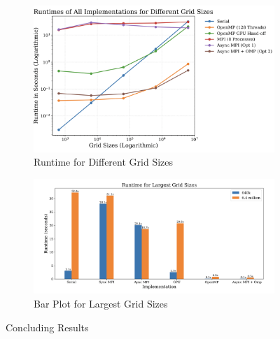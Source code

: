 \documentclass[a4paper,10pt]{article}
\begin{document}
\begin{figure}
     \centering
     \begin{subfigure}[b]{0.45\textwidth}
         \centering
         \includegraphics[width=\textwidth]{../images/final_everything_plot.png}
         \caption{Runtime for Different Grid Sizes}
         \label{fig:conclusion_line_plot}
     \end{subfigure}
     \hfill
     \begin{subfigure}[b]{0.45\textwidth}
         \centering
         \includegraphics[width=\textwidth]{../images/final_everything_bar.png}
         \caption{Bar Plot for Largest Grid Sizes}
         \label{fig:conclusion_bar_graph}
     \end{subfigure}
     \caption{Concluding Results}
     \label{fig:conclusion}
\end{figure}

\printbibliography
\end{document}
